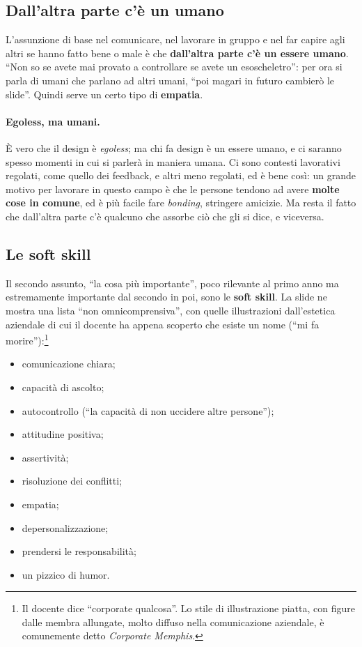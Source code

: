 \subsection{Dall'altra parte c'è un umano}

L'assunzione di base nel comunicare, nel lavorare in gruppo e nel far capire
agli altri se hanno fatto bene o male è che \textbf{dall'altra parte c'è un
essere umano}. ``Non so se avete mai provato a controllare se avete un
esoscheletro'': per ora si parla di umani che parlano ad altri umani, ``poi
magari in futuro cambierò le slide''. Quindi serve un certo tipo di
\textbf{empatia}.

\paragraph{Egoless, ma umani.} È vero che il design è \emph{egoless}; ma chi
fa design è un essere umano, e ci saranno spesso momenti in cui si parlerà
in maniera umana. Ci sono contesti lavorativi regolati, come quello dei
feedback, e altri meno regolati, ed è bene così: un grande motivo per
lavorare in questo campo è che le persone tendono ad avere \textbf{molte
cose in comune}, ed è più facile fare \emph{bonding}, stringere amicizie.
Ma resta il fatto che dall'altra parte c'è qualcuno che assorbe ciò che gli
si dice, e viceversa.

\subsection{Le soft skill}

Il secondo assunto, ``la cosa più importante'', poco rilevante al primo anno
ma estremamente importante dal secondo in poi, sono le \textbf{soft skill}.
La slide ne mostra una lista ``non omnicomprensiva'', con quelle
illustrazioni dall'estetica aziendale di cui il docente ha appena scoperto
che esiste un nome (``mi fa morire''):\footnote{Il docente dice ``corporate
qualcosa''. Lo stile di illustrazione piatta, con figure dalle membra
allungate, molto diffuso nella comunicazione aziendale, è comunemente detto
\emph{Corporate Memphis}.}
\begin{itemize}
  \item comunicazione chiara;
  \item capacità di ascolto;
  \item autocontrollo (``la capacità di non uccidere altre persone'');
  \item attitudine positiva;
  \item assertività;
  \item risoluzione dei conflitti;
  \item empatia;
  \item depersonalizzazione;
  \item prendersi le responsabilità;
  \item un pizzico di humor.
\end{itemize}

